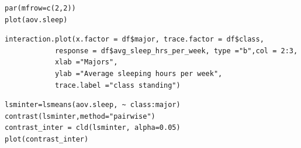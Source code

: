 \documentclass{article} %
\begin{document}
\lstset{language=R}
\lstset{frame=lines}
\lstset{basicstyle=\footnotesize}
\begin{lstlisting}
par(mfrow=c(2,2))
plot(aov.sleep)
\end{lstlisting}


\lstset{language=R}
\lstset{frame=lines}
\lstset{basicstyle=\footnotesize}
\begin{lstlisting}
interaction.plot(x.factor = df$major, trace.factor = df$class,
			response = df$avg_sleep_hrs_per_week, type ="b",col = 2:3,
			xlab ="Majors", 
			ylab ="Average sleeping hours per week",
			trace.label ="class standing")
\end{lstlisting}


\lstset{language=R}
\lstset{frame=lines}
\lstset{basicstyle=\footnotesize}
\begin{lstlisting}
lsminter=lsmeans(aov.sleep, ~ class:major)
contrast(lsminter,method="pairwise")
contrast_inter = cld(lsminter, alpha=0.05)
plot(contrast_inter)
\end{lstlisting}
\end{document}
